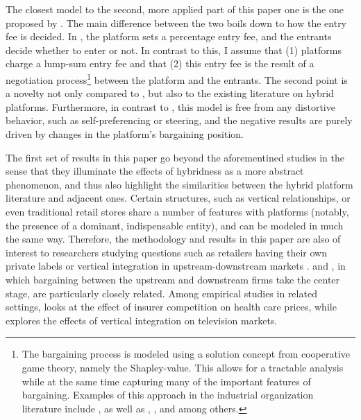 \documentclass[a4paper]{article}
\begin{document}
The closest model to the second, more applied part of this paper one is the one proposed by \textcite{anderson2021hybrid}.
The main difference between the two boils down to how the entry fee is decided.
In \textcite{anderson2021hybrid}, the platform sets a percentage entry fee, and the entrants decide whether to enter or not.
In contrast to this, I assume that (1) platforms charge a lump-sum entry fee and that (2) this entry fee is the result of a negotiation process\footnote{
    The bargaining process is modeled using a solution concept from cooperative game theory, namely the Shapley-value.
    This allows for a tractable analysis while at the same time capturing many of the important features of bargaining.
    Examples of this approach in the industrial organization literature include \textcite{montez2007downstream}, as well as \textcite{hart1990property}, \textcite{levy1997individual}, \textcite{inderst2003bargaining} and \textcite{brugemann2019intra} among others.
}
between the platform and the entrants.
The second point is a novelty not only compared to \textcite{anderson2021hybrid}, but also to the existing literature on hybrid platforms.
Furthermore, in contrast to \textcite{hagiu2022should}, this model is free from any distortive behavior, such as self-preferencing or steering, and the negative results are purely driven by changes in the platform's bargaining position.

The first set of results in this paper go beyond the aforementined studies in the sense that they illuminate the effects of hybridness as a more abstract phenomenon, and thus also highlight the similarities between the hybrid platform literature and adjacent ones.
Certain structures, such as vertical relationships, or even traditional retail stores share a number of features with platforms (notably, the presence of a dominant, indispensable entity), and can be modeled in much the same way.
Therefore, the methodology and results in this paper are also of interest to researchers studying questions such as retailers having their own private labels \parencite{steiner2004nature} or vertical integration in upstream-downstream markets \parencite{hart1990vertical,aghion2006vertical}.
\textcite{de2005vertical} and \textcite{montez2007downstream}, in which bargaining between the upstream and downstream firms take the center stage, are particularly closely related.
Among empirical studies in related settings, \textcite{ho2017insurer} looks at the effect of insurer competition on health care prices, while \textcite{crawford2018welfare} explores the effects of vertical integration on television markets.
\end{document}
